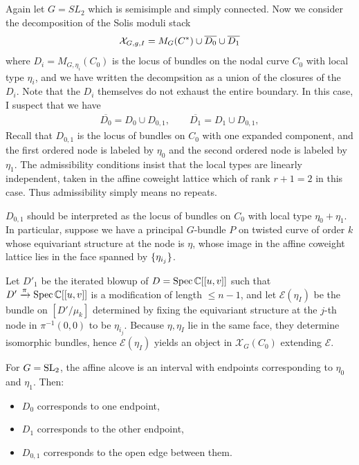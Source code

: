 \documentclass[12pt]{article}
\begin{document}
\subsection{}
Again let $G = SL_2$ which is semisimple and simply connected.
Now we consider the decomposition of the Solis moduli stack \begin{align*}
    {\mathcal{X}}_{G,g,I} = M_G(C^*) \cup \overline{D_0} \cup \overline{D_1}
\end{align*} where $D_i = M_{G,\eta_i}(C_0)$ is the locus of bundles on the nodal curve $C_0$ with local type $\eta_i$, and we have written the decompsition as a union of the closures of the $D_i$. Note that the $D_i$ themselves do not exhaust the entire boundary. In this case, I suspect that we have \begin{align*}
    \overline{D_0} = D_0 \cup D_{0,1},
    \qquad
    \overline{D_1} = D_1 \cup D_{0,1}, 
\end{align*}  Recall that $D_{0,1}$ is the locus of bundles on $C_0$ with one expanded component, and the first ordered node is labeled by $\eta_0$ and the second ordered node is labeled by $\eta_1$. The admissibility conditions insist that the local types are linearly independent, taken in the affine coweight lattice which of rank $r+1 = 2$ in this case. Thus admissibility simply means no repeats.

$D_{0,1}$ should be interpreted as the locus of bundles on $C_0$ with local type $\eta_0 + \eta_1$. In particular, suppose we have a principal $G$-bundle $P$ on  twisted curve of order $k$ whose equivariant structure at the node is $\eta$, whose image in the affine coweight lattice lies in the face spanned by $\{\eta_{i_j}\}$.

Let $D'_1$ be the iterated blowup of $D = \operatorname{Spec} \mathbb{C}[[u,v]]$ such that $D' \xrightarrow{\pi} \operatorname{Spec} \mathbb{C}[[u,v]]$ is a modification of length $\le n-1$, and let $\mathcal{E}(\eta_I)$ be the bundle on $[D'/\mu_k]$ determined by fixing the equivariant structure at the $j$-th node in $\pi^{-1}(0,0)$ to be $\eta_{i_j}$. Because $\eta, \eta_I$ lie in the same face, they determine isomorphic bundles, hence $\mathcal{E}(\eta_I)$ yields an object in $\mathcal{X}_G(C_0)$ extending $\mathcal{E}$.

For $G=\operatorname{SL}_2$, the affine alcove is an interval with endpoints corresponding to $\eta_0$ and $\eta_1$. Then:
\begin{itemize}
    \item $D_0$ corresponds to one endpoint,
    \item $D_1$ corresponds to the other endpoint,
    \item $D_{0,1}$ corresponds to the open edge between them.
\end{itemize}
\end{document}
